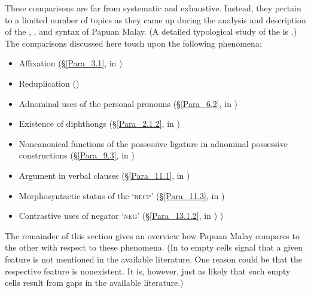 {These comparisons are far from systematic and exhaustive. Instead, they pertain to a limited number of topics as they came up during the analysis and description of the , , and syntax of Papuan Malay. (A detailed typological study of the  is \citealt{Paauw.2009}.) The comparisons discussed here touch upon the following phenomena:


\begin{itemize}
\item 
Affixation (§\ref{Para_3.1}, in )

\item 
Reduplication ()

\item 
Adnominal uses of the personal pronouns (§\ref{Para_6.2}, in )

\item 
Existence of diphthongs (§\ref{Para_2.1.2}, in )

\item 
Noncanonical functions of the possessive ligature in adnominal possessive constructions (§\ref{Para_9.3}, in )

\item 
Argument  in verbal clauses (§\ref{Para_11.1}, in )

\item 
Morphosyntactic status of the   ‘\textsc{recp}’ (§\ref{Para_11.3}, in )

\item 
Contrastive uses of negator  ‘\textsc{neg}’ (§\ref{Para_13.1.2}, in )
)

\end{itemize}


The remainder of this section gives an overview how Papuan Malay compares to the other  with respect to these phenomena. (In  to  empty cells signal that a given feature is not mentioned in the available literature. One reason could be that the respective feature is nonexistent. It is, however, just as likely that such empty cells result from gaps in the available literature.)



}
